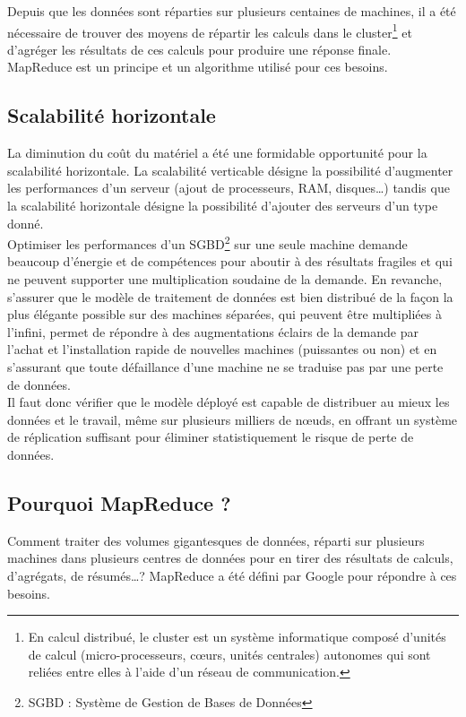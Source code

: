Depuis que les données sont réparties sur plusieurs centaines de machines, il a été nécessaire de trouver des moyens de répartir les calculs dans le cluster\footnote{En calcul distribué, le cluster est un système informatique composé d'unités de calcul (micro-processeurs, cœurs, unités centrales) autonomes qui sont reliées entre elles à l'aide d'un réseau de communication.\cite{Wikipedia_cluster}} et d'agréger les résultats de ces calculs pour produire une réponse finale. MapReduce est un principe et un algorithme utilisé pour ces besoins.

\subsection{Scalabilité horizontale}
	La diminution du coût du matériel a été une formidable opportunité pour la scalabilité horizontale. La scalabilité verticable désigne la possibilité d'augmenter les performances d'un serveur (ajout de processeurs, RAM, disques\dots) tandis que la scalabilité horizontale désigne la possibilité d'ajouter des serveurs d'un type donné.\cite{Wikipedia_scalabilite}\\

	Optimiser les performances d'un SGBD\footnote{SGBD : Système de Gestion de Bases de Données} sur une seule machine demande beaucoup d'énergie et de compétences pour aboutir à des résultats fragiles et qui ne peuvent supporter une multiplication soudaine de la demande. En revanche, s'assurer que le modèle de traitement de données est bien distribué de la façon la plus élégante possible sur des machines séparées, qui peuvent être multipliées à l'infini, permet de répondre à des augmentations éclairs de la demande par l'achat et l'installation rapide de nouvelles machines (puissantes ou non) et en s'assurant que toute défaillance d'une machine ne se traduise pas par une perte de données.\\

	Il faut donc vérifier que le modèle déployé est capable de distribuer au mieux les données et le travail, même sur plusieurs milliers de nœuds, en offrant un système de réplication suffisant pour éliminer statistiquement le risque de perte de données.

\subsection{Pourquoi MapReduce ?}
	Comment traiter des volumes gigantesques de données, réparti sur plusieurs machines dans plusieurs centres de données pour en tirer des résultats de calculs, d'agrégats, de résumés\dots ? MapReduce a été défini par Google pour répondre à ces besoins.

